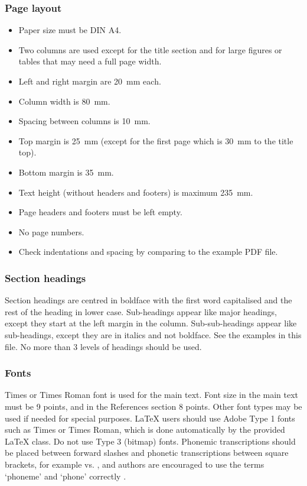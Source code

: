 \documentclass[cameraready]{Interspeech}
\begin{document}
\subsubsection{Page layout}

\begin{itemize}
\item Paper size must be DIN A4.
\item Two columns are used except for the title section and for large figures or tables that may need a full page width.
\item Left and right margin are \SI{20}{\milli\metre} each.
\item Column width is \SI{80}{\milli\metre}.
\item Spacing between columns is \SI{10}{\milli\metre}.
\item Top margin is \SI{25}{\milli\metre} (except for the first page which is \SI{30}{\milli\metre} to the title top).
\item Bottom margin is \SI{35}{\milli\metre}.
\item Text height (without headers and footers) is maximum \SI{235}{\milli\metre}.
\item Page headers and footers must be left empty.
\item No page numbers.
\item Check indentations and spacing by comparing to the example PDF file.
\end{itemize}

\subsubsection{Section headings}

Section headings are centred in boldface with the first word capitalised and the rest of the heading in lower case. Sub-headings appear like major headings, except they start at the left margin in the column. Sub-sub-headings appear like sub-headings, except they are in italics and not boldface. See the examples in this file. No more than 3 levels of headings should be used.

\subsubsection{Fonts}

Times or Times Roman font is used for the main text. Font size in the main text must be 9 points, and in the References section 8 points. Other font types may be used if needed for special purposes. \LaTeX\xspace users should use Adobe Type 1 fonts such as Times or Times Roman, which is done automatically by the provided \LaTeX\xspace class. Do not use Type 3 (bitmap) fonts. Phonemic transcriptions should be placed between forward slashes and phonetic transcriptions between square brackets, for example  vs. \textipa{[lO:r@nO:d@]}, and authors are encouraged to use the terms `phoneme' and `phone' correctly \cite{moore19_interspeech}.
\end{document}
